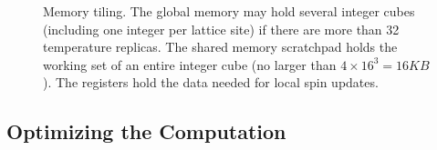 \begin{figure}[!h]
  \centering
  \hspace{0.2cm}
  \hspace{0.2cm}

  \caption{Memory tiling.  The global memory may hold several integer cubes (including one integer
per lattice site) if there are more than 32 temperature replicas.  The shared memory scratchpad holds 
the working set of an entire integer cube (no larger than $4 \times 16^3 = 16KB$).  The registers hold the
data needed for local spin updates.}
  \label{fig_tile}
\end{figure}



\subsection{Optimizing the Computation}

